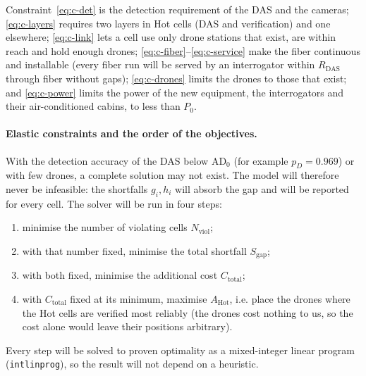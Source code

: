 \documentclass[11pt,a4paper]{article}
\newcommand{\ADzero}{\mathrm{AD}_{0}}
\newcommand{\Ctotal}{C_{\mathrm{total}}}
\newcommand{\Pzero}{P_{0}}
\begin{document}
Constraint~\eqref{eq:c-det} is the detection requirement of the DAS and the cameras; \eqref{eq:c-layers} requires two layers in Hot cells (DAS and verification) and one elsewhere;
\eqref{eq:c-link} lets a cell use only drone stations that exist, are within reach and hold enough drones; \eqref{eq:c-fiber}--\eqref{eq:c-service} make the fiber continuous
and installable (every fiber run will be served by an interrogator within $R_{\mathrm{DAS}}$ through fiber without gaps); \eqref{eq:c-drones} limits the drones to those that exist; and \eqref{eq:c-power}
limits the power of the new equipment, the interrogators and their air-conditioned cabins, to less than $\Pzero$.

\paragraph{Elastic constraints and the order of the objectives.} With the detection accuracy of the DAS below $\ADzero$ (for example $p_D=0.969$) or with few drones, a complete solution may not exist.
The model will therefore never be infeasible: the shortfalls $g_i,h_i$ will absorb the gap and will be reported for every cell. The solver will be run in four steps:
\begin{enumerate}
  \item minimise the number of violating cells $N_{\mathrm{viol}}$;
  \item with that number fixed, minimise the total shortfall $S_{\mathrm{gap}}$;
  \item with both fixed, minimise the additional cost $\Ctotal$;
  \item with $\Ctotal$ fixed at its minimum, maximise $A_{\mathrm{Hot}}$, i.e. place the drones where the Hot cells are verified most reliably (the drones cost nothing to us, so the cost alone would leave their positions arbitrary).
\end{enumerate}
Every step will be solved to proven optimality as a mixed-integer linear program (\texttt{intlinprog}), so the result will not depend on a heuristic.
\end{document}
